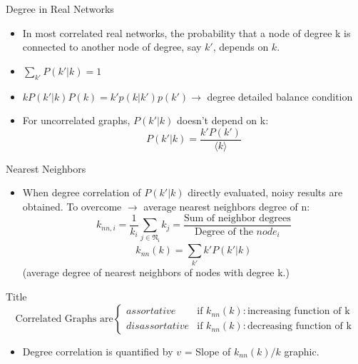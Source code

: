 \documentclass{beamer}
\begin{document}
\begin{frame}{Degree in Real Networks}
\begin{center}
\end{center}

\begin{itemize}
 \item In most correlated real networks, the probability that a node of degree k is connected to another node of degree, say $k'$, depends on $k$.
 \item $\sum_{k'} P(k'|k) = 1$
 \item $kP(k'|k)P(k) = k'p(k|k')p(k') \rightarrow$ degree detailed balance condition
 \item For uncorrelated graphs, $P(k'|k)$ doesn't depend on k:
\[
 P(k'|k) = \frac{k'P(k')}{\langle k \rangle}
\]

\end{itemize}

\end{frame}



\begin{frame}{Nearest Neighbors}

\begin{itemize}
 \item When degree correlation of $P(k'|k)$ directly evaluated, noisy results are obtained. To overcome $\rightarrow$ average nearest neighbors degree of n:
\[
 k_{nn,i} = \frac{1}{k_i} \sum_{j\in\mathfrak{N_i}}^{} k_j = \frac{\text{Sum of neighbor degrees}}{\text{Degree of the } node_i}
\]
\[
 k_{nn} (k) = \sum_{k'}^{} k'P(k'|k)
\]
(average degree of nearest neighbors of nodes with degree k.)
 
\end{itemize}
\end{frame}



\begin{frame}{Title}
\[ 
\text{Correlated Graphs are}
    \begin{cases}
    assortative & \text{if } k_{nn} (k): \text{increasing function of k}\\
    disassortative & \text{if } k_{nn} (k): \text{decreasing function of k}
    \end{cases}
\]

\begin{itemize}
 \item Degree correlation is quantified by $v$ = Slope of $k_{nn}(k) / k$ graphic.
\end{itemize}

\end{frame}
\end{document}
